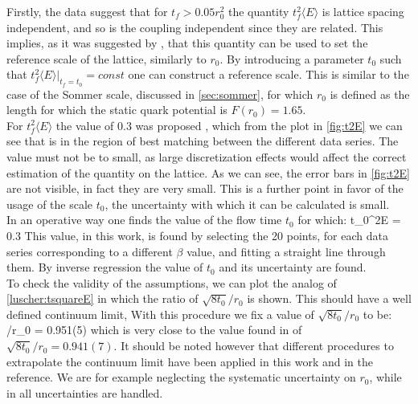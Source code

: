 Firstly, the data suggest that for $t_f > 0.05r_0^2$ the quantity $t_f^2\langle E \rangle$ is lattice spacing independent, and so is the coupling independent since they are related. This implies, as it was suggested by \cite{luscher_properties_2010}, that this quantity can be used to set the reference scale of the lattice, similarly to $r_0$. By introducing a parameter $t_0$ such that $t_f^2\langle E \rangle |_{t_f=t_0} = const$ one can construct a reference scale. This is similar to the case of the Sommer scale, discussed in \cref{sec:sommer}, for which $r_0$ is defined as the length for which the static quark potential is $F(r_0)=1.65$. \\
For $t_f^2\langle E \rangle$ the value of $0.3$ was proposed \cite{luscher_properties_2010}, which from the plot in \cref{fig:t2E} we can see that is in the region of best matching between the different data series. The value must not be to small, as large discretization effects would affect the correct estimation of the quantity on the lattice. As we can see, the error bars in \cref{fig:t2E} are not visible, in fact they are very small. This is a further point in favor of the usage of the scale $t_0$, the uncertainty with which it can be calculated is small.\\
In an operative way one finds the value of the flow time $t_0$ for which:
\beq
    t_0^2\langle E \rangle = 0.3
\eeq
This value, in this work, is found by selecting the 20 points, for each data series corresponding to a different $\beta$ value, and fitting a straight line through them. By inverse regression the value of $t_0$ and its uncertainty are found.\\
To check the validity of the assumptions, we can plot the analog of \cref{luscher:tsquareE} in which the ratio of $\sqrt{8t_0}/r_0$ is shown. This should have a well defined continuum limit, 
With this procedure we fix a value of $\sqrt{8t_0}/r_0$ to be:
\beq
{}/r_0 = 0.951(5)
\eeq 
which is very close to the value found in \cite{ce_non-gaussianities_2015} of $\sqrt{8t_0}/r_0 = 0.941(7)$. It should be noted however that different procedures to extrapolate the continuum limit have been applied in this work and in the reference. We are for example neglecting the systematic uncertainty on $r_0$, while in \cite{ce_non-gaussianities_2015} all uncertainties are handled.
 
